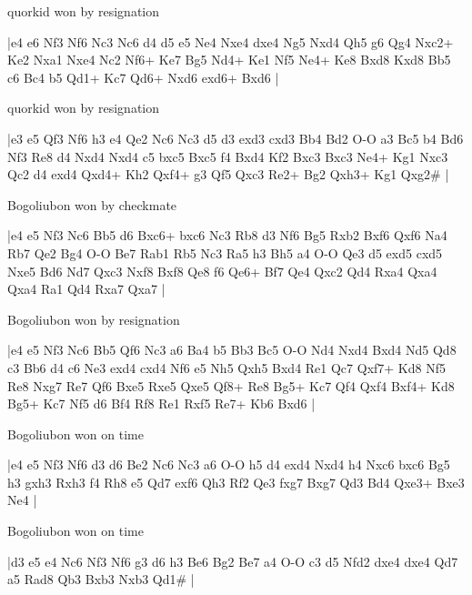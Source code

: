 \showboard

quorkid won by resignation

\makegametitle
|e4 e6 Nf3 Nf6 Nc3 Nc6 d4 d5 e5 Ne4 Nxe4 dxe4 Ng5 Nxd4 Qh5 g6 Qg4 Nxc2+ Ke2 Nxa1 Nxe4 Nc2 Nf6+ Ke7 Bg5 Nd4+ Ke1 Nf5 Ne4+ Ke8 Bxd8 Kxd8 Bb5 c6 Bc4 b5 Qd1+ Kc7 Qd6+ Nxd6 exd6+ Bxd6  |

\showboard

quorkid won by resignation

\makegametitle
|e3 e5 Qf3 Nf6 h3 e4 Qe2 Nc6 Nc3 d5 d3 exd3 cxd3 Bb4 Bd2 O-O a3 Bc5 b4 Bd6 Nf3 Re8 d4 Nxd4 Nxd4 c5 bxc5 Bxc5 f4 Bxd4 Kf2 Bxc3 Bxc3 Ne4+ Kg1 Nxc3 Qc2 d4 exd4 Qxd4+ Kh2 Qxf4+ g3 Qf5 Qxc3 Re2+ Bg2 Qxh3+ Kg1 Qxg2\#  |

\showboard

Bogoliubon won by checkmate

\makegametitle
|e4 e5 Nf3 Nc6 Bb5 d6 Bxc6+ bxc6 Nc3 Rb8 d3 Nf6 Bg5 Rxb2 Bxf6 Qxf6 Na4 Rb7 Qe2 Bg4 O-O Be7 Rab1 Rb5 Nc3 Ra5 h3 Bh5 a4 O-O Qe3 d5 exd5 cxd5 Nxe5 Bd6 Nd7 Qxc3 Nxf8 Bxf8 Qe8 f6 Qe6+ Bf7 Qe4 Qxc2 Qd4 Rxa4 Qxa4 Qxa4 Ra1 Qd4 Rxa7 Qxa7  |

\showboard

Bogoliubon won by resignation

\makegametitle
|e4 e5 Nf3 Nc6 Bb5 Qf6 Nc3 a6 Ba4 b5 Bb3 Bc5 O-O Nd4 Nxd4 Bxd4 Nd5 Qd8 c3 Bb6 d4 c6 Ne3 exd4 cxd4 Nf6 e5 Nh5 Qxh5 Bxd4 Re1 Qc7 Qxf7+ Kd8 Nf5 Re8 Nxg7 Re7 Qf6 Bxe5 Rxe5 Qxe5 Qf8+ Re8 Bg5+ Kc7 Qf4 Qxf4 Bxf4+ Kd8 Bg5+ Kc7 Nf5 d6 Bf4 Rf8 Re1 Rxf5 Re7+ Kb6 Bxd6  |

\showboard

Bogoliubon won on time

\makegametitle
|e4 e5 Nf3 Nf6 d3 d6 Be2 Nc6 Nc3 a6 O-O h5 d4 exd4 Nxd4 h4 Nxc6 bxc6 Bg5 h3 gxh3 Rxh3 f4 Rh8 e5 Qd7 exf6 Qh3 Rf2 Qe3 fxg7 Bxg7 Qd3 Bd4 Qxe3+ Bxe3 Ne4  |

\showboard

Bogoliubon won on time

\makegametitle
|d3 e5 e4 Nc6 Nf3 Nf6 g3 d6 h3 Be6 Bg2 Be7 a4 O-O c3 d5 Nfd2 dxe4 dxe4 Qd7 a5 Rad8 Qb3 Bxb3 Nxb3 Qd1\#  |

